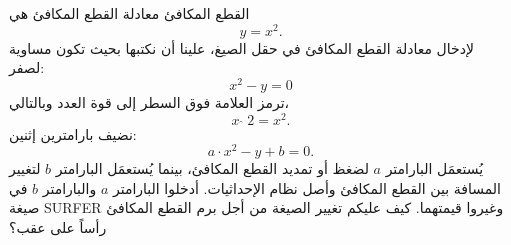 \begin{surferPage}[Parabola]{القطع المكافئ}
معادلة القطع المكافئ هي  \[y=x^2.\]
لإدخال معادلة القطع المكافئ في حقل الصيغ، علينا أن نكتبها بحيث تكون مساوية لصفر: 
\[x^2-y=0\]
ترمز العلامة فوق السطر إلى قوة العدد وبالتالي،
\[ x  \,\hat{\ } \, 2 =x^2.\]
نضيف بارامترين إثنين:
\[a \cdot x^2-y+b=0.\]
يُستعمَل البارامتر $a$ لضغظ أو تمديد القطع المكافئ، بينما يُستعمَل البارامتر $b$ لتغيير المسافة بين القطع المكافئ وأصل نظام الإحداثيات.
\newline
أدخلوا البارامتر $a$ والبارامتر $b$ في صيغة SURFER وغيروا قيمتهما. كيف عليكم تغيير الصيغة من أجل برم القطع المكافئ رأساً على عقب؟
\end{surferPage}
